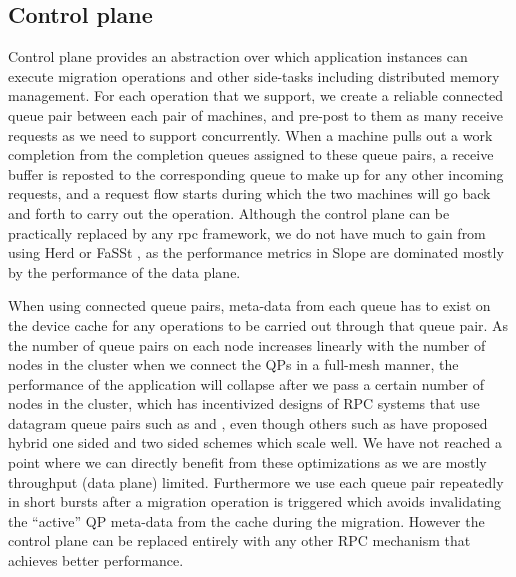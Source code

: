 \subsection{Control plane}
Control plane provides an abstraction over which application instances can
execute migration operations and other side-tasks including distributed
memory management. For each operation that we support, we create a reliable
connected queue pair between each pair of machines, and pre-post to them
as many receive requests as we need to support concurrently. When a
machine pulls out a work completion from the completion queues assigned to
these queue pairs, a receive buffer is reposted to the corresponding queue to
make up for any other incoming requests, and a request flow starts during which
the two machines will go back and forth to carry out the operation. Although
the control plane can be practically replaced by any rpc framework, we do not
have much to gain from using Herd \cite{kalia2016designguidelines} or
FaSSt \cite{kalia2016fasst}, as the performance metrics in Slope are dominated mostly
by the performance of the data plane.

When using connected queue pairs, meta-data
from each queue has to exist on the device cache for any operations to be
carried out through that queue pair. As the number of queue pairs on each node
increases linearly with the number of nodes in the cluster when we connect the
QPs in a full-mesh manner, the performance of the application will collapse
after we pass a certain number of nodes in the cluster, which has
incentivized designs of RPC systems that use datagram queue pairs such as
\cite{kalia2019datacenter} and \cite{kalia2016fasst}, even though others such
as \cite{novakovic2019storm} have proposed hybrid one sided and two sided
schemes which scale well. We have not reached a point where we can directly
benefit from these optimizations as we are mostly throughput (data plane)
limited. Furthermore we use each queue pair repeatedly in short bursts after a
migration operation is triggered which avoids invalidating the ``active'' QP
meta-data from the cache during the migration. However the control plane
can be replaced entirely with any other RPC mechanism that achieves better
performance.

